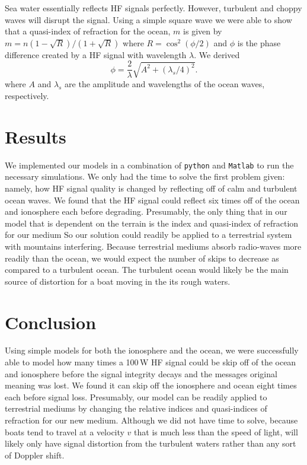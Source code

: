 \documentclass[11pt, twocolumn]{article}
\numberwithin{equation}{section}
\begin{document}
Sea water essentially reflects HF signals perfectly.\cite{seawater_index} However, turbulent and choppy waves will disrupt the signal. Using a simple square wave we were able to show that a quasi-index of refraction for the ocean, $m$ is given by $m = n (1 - \sqrt R)/(1+\sqrt{R})$ where $R = \cos^2(\phi/2)$ and $\phi$ is the phase difference created by a HF signal with wavelength $\lambda$. We derived
\begin{equation}
    \phi  = \frac{2}{\lambda}\sqrt{A^2 + (\lambda_s/4)^2}.
\end{equation}
where $A$ and $\lambda_s$ are the amplitude and wavelengths of the ocean waves, respectively.

\section{Results} %
\label{sec:results}
 
 We implemented our models in a combination of \texttt{python} and \texttt{Matlab} to run the necessary simulations. We only had the time to solve the first problem given: namely, how HF signal quality is changed by reflecting off of calm and turbulent ocean waves. We found that the HF signal could reflect six times off of the ocean and ionosphere each before degrading. Presumably, the only thing that in our model that is dependent on the terrain is the index and quasi-index of refraction for our medium So our solution could readily be applied to a terrestrial system with mountains interfering. Because terrestrial mediums absorb radio-waves more readily than the ocean, we would expect the number of skips to decrease as compared to a turbulent ocean. The turbulent ocean would likely be the main source of distortion for a boat moving in the its rough waters.


\section{Conclusion}
\label{sec: conclusion}

Using simple models for both the ionosphere and the ocean, we were successfully able to model how many times a 100\,\si{\watt} HF signal could be skip off of the ocean and ionosphere before the signal integrity decays and the messages original meaning was lost. We found it can skip off the ionosphere and ocean eight times each before signal loss. Presumably, our model can be readily applied to terrestrial mediums by changing the relative indices and quasi-indices of refraction for our new medium. Although we did not have time to solve, because boats tend to travel at a velocity $v$ that is much less than the speed of light, will likely only have signal distortion from the turbulent waters rather than any sort of Doppler shift.
\end{document}
